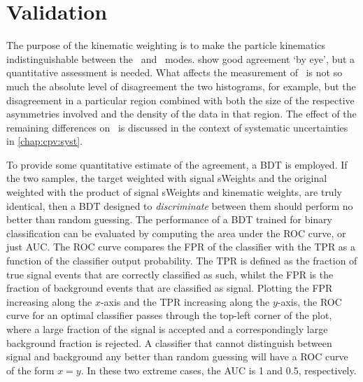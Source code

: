 \section{Validation}
\label{chap:cpv:kinematic_weighting:validation}

The purpose of the kinematic weighting is to make the particle kinematics 
indistinguishable between the \pKK\ and \ppipi\ modes.
show good agreement `by eye', but a quantitative assessment is needed.
What affects the measurement of \dACP\ is not so much the absolute level of 
disagreement the two histograms, for example, but the disagreement in a 
particular region combined with both the size of the respective asymmetries 
involved and the density of the data in that region.
The effect of the remaining differences on \dACP\ is discussed in the context 
of systematic uncertainties in \cref{chap:cpv:syst}.

To provide some quantitative estimate of the agreement, a \ac{BDT} is employed.
If the two samples, the target weighted with signal sWeights and the original 
weighted with the product of signal sWeights and kinematic weights, are truly 
identical, then a \ac{BDT} designed to \emph{discriminate} between them should 
perform no better than random guessing.
The performance of a \ac{BDT} trained for binary classification can be 
evaluated by computing the area under the \ac{ROC} curve, or just \ac{AUC}.
The \ac{ROC} curve compares the \ac{FPR} of the classifier with the \ac{TPR} as 
a function of the classifier output probability.
The \ac{TPR} is defined as the fraction of true signal events that are 
correctly classified as such, whilst the \ac{FPR} is the fraction of background 
events that are classified as signal.
Plotting the \ac{FPR} increasing along the $x$-axis and the \ac{TPR} increasing 
along the $y$-axis, the \ac{ROC} curve for an optimal classifier passes through 
the top-left corner of the plot, where a large fraction of the signal is 
accepted and a correspondingly large background fraction is rejected.
A classifier that cannot distinguish between signal and background any better 
than random guessing will have a \ac{ROC} curve of the form $x = y$.
In these two extreme cases, the \ac{AUC} is 1 and 0.5, respectively.

